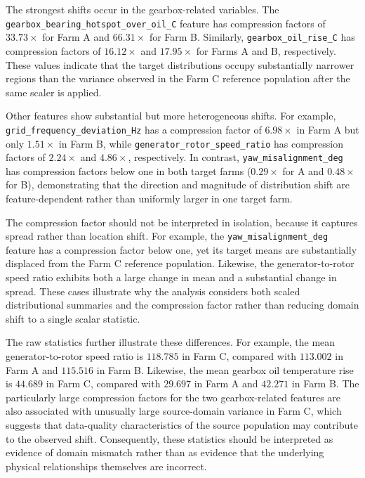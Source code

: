 \documentclass[conference]{IEEEtran}
\begin{document}
The strongest shifts occur in the gearbox-related variables. The
\texttt{gearbox\_bearing\_hotspot\_over\_oil\_C} feature has compression factors
of $33.73\times$ for Farm A and $66.31\times$ for Farm B. Similarly,
\texttt{gearbox\_oil\_rise\_C} has compression factors of $16.12\times$ and
$17.95\times$ for Farms A and B, respectively. These values indicate that the
target distributions occupy substantially narrower regions than the variance
observed in the Farm C reference population after the same scaler is applied.

Other features show substantial but more heterogeneous shifts. For example,
\texttt{grid\_frequency\_deviation\_Hz} has a compression factor of
$6.98\times$ in Farm A but only $1.51\times$ in Farm B, while
\texttt{generator\_rotor\_speed\_ratio} has compression factors of
$2.24\times$ and $4.86\times$, respectively. In contrast,
\texttt{yaw\_misalignment\_deg} has compression factors below one in both
target farms ($0.29\times$ for A and $0.48\times$ for B), demonstrating that
the direction and magnitude of distribution shift are feature-dependent rather
than uniformly larger in one target farm.

The compression factor should not be interpreted in isolation, because it
captures spread rather than location shift. For example, the
\texttt{yaw\_misalignment\_deg} feature has a compression factor below one,
yet its target means are substantially displaced from the Farm C reference
population. Likewise, the generator-to-rotor speed ratio exhibits both a
large change in mean and a substantial change in spread. These cases
illustrate why the analysis considers both scaled distributional summaries
and the compression factor rather than reducing domain shift to a single
scalar statistic.

The raw statistics further illustrate these differences. For example, the
mean generator-to-rotor speed ratio is $118.785$ in Farm C, compared with
$113.002$ in Farm A and $115.516$ in Farm B. Likewise, the mean gearbox oil
temperature rise is $44.689$ in Farm C, compared with $29.697$ in Farm A and
$42.271$ in Farm B. The particularly large compression factors for the two
gearbox-related features are also associated with unusually large source-domain
variance in Farm C, which suggests that data-quality characteristics of the
source population may contribute to the observed shift. Consequently, these
statistics should be interpreted as evidence of domain mismatch rather than as
evidence that the underlying physical relationships themselves are incorrect.
\end{document}
